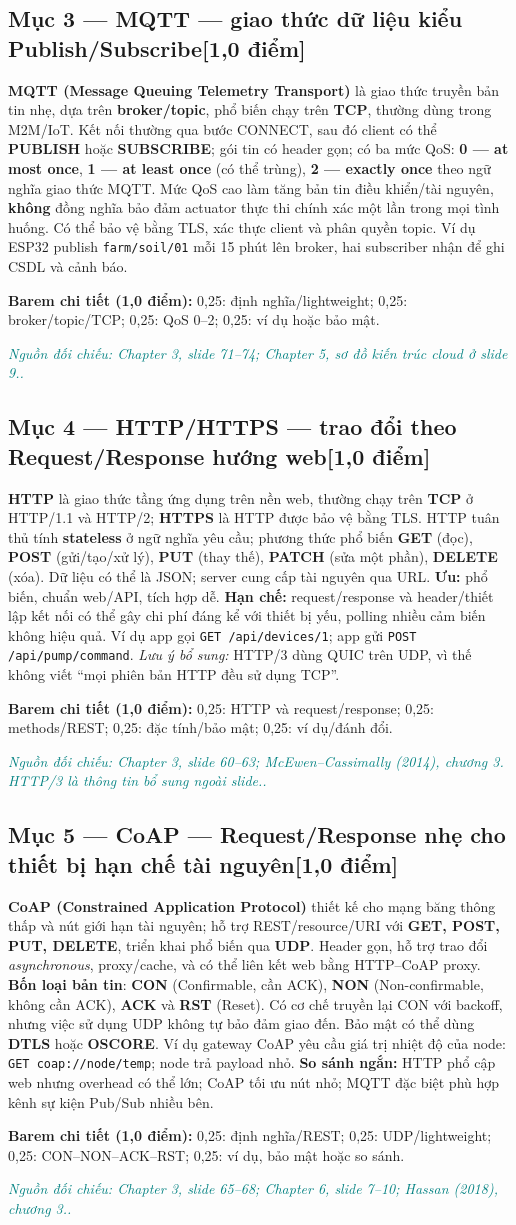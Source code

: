 \documentclass[11pt,a4paper]{article}
\newcommand{\pointpart}[2]{\subsection*{Mục #1 --- #2\hfill\normalsize\color{teal}[1,0 điểm]}}
\newcommand{\src}[1]{\par\noindent\textcolor{teal}{\footnotesize\textit{Nguồn đối chiếu: #1.}}\par}
\newcommand{\scoring}[1]{\par\noindent\textbf{Barem chi tiết (1,0 điểm):} #1\par}
\newcommand{\kw}[1]{\textbf{#1}}
\begin{document}
\pointpart{3}{MQTT --- giao thức dữ liệu kiểu Publish/Subscribe}
\kw{MQTT (Message Queuing Telemetry Transport)} là giao thức truyền bản tin nhẹ, dựa trên \kw{broker/topic}, phổ biến chạy trên \kw{TCP}, thường dùng trong M2M/IoT. Kết nối thường qua bước CONNECT, sau đó client có thể \kw{PUBLISH} hoặc \kw{SUBSCRIBE}; gói tin có header gọn; có ba mức QoS: \kw{0 --- at most once}, \kw{1 --- at least once} (có thể trùng), \kw{2 --- exactly once} theo ngữ nghĩa giao thức MQTT. Mức QoS cao làm tăng bản tin điều khiển/tài nguyên, \kw{không} đồng nghĩa bảo đảm actuator thực thi chính xác một lần trong mọi tình huống. Có thể bảo vệ bằng TLS, xác thực client và phân quyền topic. Ví dụ ESP32 publish \texttt{farm/soil/01} mỗi 15 phút lên broker, hai subscriber nhận để ghi CSDL và cảnh báo.
\scoring{0,25: định nghĩa/lightweight; 0,25: broker/topic/TCP; 0,25: QoS 0--2; 0,25: ví dụ hoặc bảo mật.}
\src{Chapter 3, slide 71--74; Chapter 5, sơ đồ kiến trúc cloud ở slide 9.}

\pointpart{4}{HTTP/HTTPS --- trao đổi theo Request/Response hướng web}
\kw{HTTP} là giao thức tầng ứng dụng trên nền web, thường chạy trên \kw{TCP} ở HTTP/1.1 và HTTP/2; \kw{HTTPS} là HTTP được bảo vệ bằng TLS. HTTP tuân thủ tính \kw{stateless} ở ngữ nghĩa yêu cầu; phương thức phổ biến \kw{GET} (đọc), \kw{POST} (gửi/tạo/xử lý), \kw{PUT} (thay thế), \kw{PATCH} (sửa một phần), \kw{DELETE} (xóa). Dữ liệu có thể là JSON; server cung cấp tài nguyên qua URL. \kw{Ưu:} phổ biến, chuẩn web/API, tích hợp dễ. \kw{Hạn chế:} request/response và header/thiết lập kết nối có thể gây chi phí đáng kể với thiết bị yếu, polling nhiều cảm biến không hiệu quả. Ví dụ app gọi \texttt{GET /api/devices/1}; app gửi \texttt{POST /api/pump/command}. \emph{Lưu ý bổ sung:} HTTP/3 dùng QUIC trên UDP, vì thế không viết ``mọi phiên bản HTTP đều sử dụng TCP''.
\scoring{0,25: HTTP và request/response; 0,25: methods/REST; 0,25: đặc tính/bảo mật; 0,25: ví dụ/đánh đổi.}
\src{Chapter 3, slide 60--63; McEwen--Cassimally (2014), chương 3. HTTP/3 là thông tin bổ sung ngoài slide.}

\pointpart{5}{CoAP --- Request/Response nhẹ cho thiết bị hạn chế tài nguyên}
\kw{CoAP (Constrained Application Protocol)} thiết kế cho mạng băng thông thấp và nút giới hạn tài nguyên; hỗ trợ REST/resource/URI với \kw{GET, POST, PUT, DELETE}, triển khai phổ biến qua \kw{UDP}. Header gọn, hỗ trợ trao đổi \emph{asynchronous}, proxy/cache, và có thể liên kết web bằng HTTP--CoAP proxy. \kw{Bốn loại bản tin}: \kw{CON} (Confirmable, cần ACK), \kw{NON} (Non-confirmable, không cần ACK), \kw{ACK} và \kw{RST} (Reset). Có cơ chế truyền lại CON với backoff, nhưng việc sử dụng UDP không tự bảo đảm giao đến. Bảo mật có thể dùng \kw{DTLS} hoặc \kw{OSCORE}. Ví dụ gateway CoAP yêu cầu giá trị nhiệt độ của node: \texttt{GET coap://node/\allowbreak temp}; node trả payload nhỏ. \kw{So sánh ngắn:} HTTP phổ cập web nhưng overhead có thể lớn; CoAP tối ưu nút nhỏ; MQTT đặc biệt phù hợp kênh sự kiện Pub/Sub nhiều bên.
\scoring{0,25: định nghĩa/REST; 0,25: UDP/lightweight; 0,25: CON--NON--ACK--RST; 0,25: ví dụ, bảo mật hoặc so sánh.}
\src{Chapter 3, slide 65--68; Chapter 6, slide 7--10; Hassan (2018), chương 3.}
\end{document}

